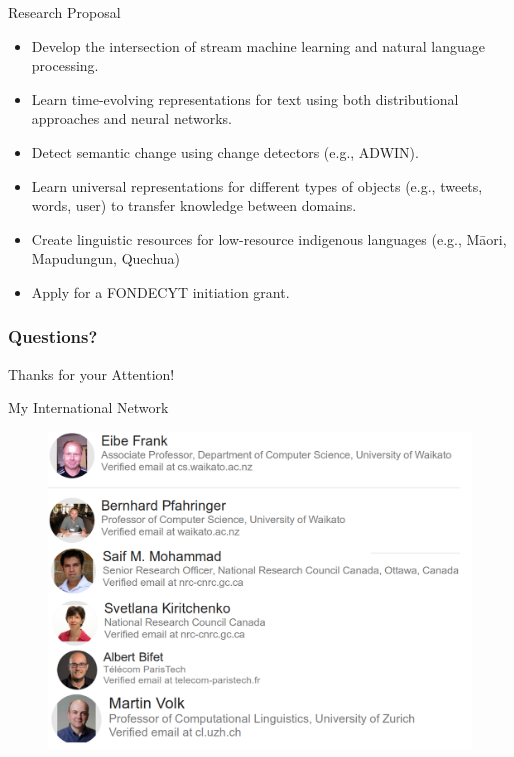 \documentclass[handout]{beamer}
\begin{document}
\begin{frame}{Research Proposal}
\begin{scriptsize}

\begin{itemize}
 \item Develop the intersection of stream machine learning and natural language processing. 
 \item Learn time-evolving representations for text using both distributional approaches and neural networks.
 \item Detect semantic change using change detectors (e.g., ADWIN).
 \item Learn universal representations for different types of objects (e.g., tweets, words, user) to transfer knowledge between domains.
 \item Create linguistic resources for low-resource indigenous languages (e.g., M\={a}ori, Mapudungun, Quechua)
 \item Apply for a FONDECYT initiation grant. 
\end{itemize}
\end{scriptsize}

\end{frame}





\begin{frame}
\frametitle{Questions?}
\begin{center}\LARGE Thanks for your Attention!\\  \end{center}

\end{frame}


\begin{frame}{My International Network}
     \begin{figure}[h]
        	\includegraphics[scale = 0.3]{pics/collaborations.png}
        \end{figure}


\end{frame}



\end{document}
